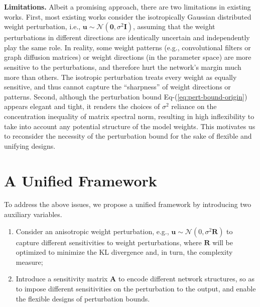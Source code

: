 \documentclass[journal]{IEEEtran} %
\def\eqref#1{Eq-(\ref{#1})}
\def\vzero{{\bm{0}}}
\def\vu{{\bm{u}}}
\def\mA{{\bm{A}}}
\def\mI{{\bm{I}}}
\def\mR{{\bm{R}}}
\begin{document}
\textbf{Limitations.} Albeit a promising approach, there are two limitations in existing works. First, most existing works consider the isotropically Gaussian distributed weight perturbation, i.e., $\vu \sim \mathcal{N}(\vzero,\sigma^2 \mI)$, assuming that the weight perturbations in different directions are identically uncertain and independently play the same role. In reality, some weight patterns (e.g., convolutional filters or graph diffusion matrices) or weight directions (in the parameter space) are more sensitive to the perturbations, and therefore hurt the network's margin much more than others. The isotropic perturbation treats every weight as equally sensitive, and thus cannot capture the ``sharpness'' of weight directions or patterns. 
Second, although the perturbation bound \eqref{eq:pert-bound-origin} appears elegant and tight, it renders the choices of $\sigma^2$ reliance on the concentration inequality of matrix spectral norm, resulting in high inflexibility to take into account any potential structure of the model weights. This motivates us to reconsider the necessity of the perturbation bound for the sake of flexible and unifying designs.



\section{A Unified Framework}
\label{headings}
To address the above issues, we propose a unified framework by introducing two auxiliary variables.
\begin{enumerate}
    \item Consider an anisotropic weight perturbation, e.g., $\vu \sim \mathcal{N}(0,\sigma^2 \mR)$ to capture different sensitivities to weight perturbations, where $\mR$ will be optimized to minimize the KL divergence and, in turn, the complexity measure;
    \item Introduce a sensitivity matrix $\mA$ to encode different network structures, so as to impose different sensitivities on the perturbation to the output, and enable the flexible designs of perturbation bounds.  
\end{enumerate}
\end{document}
